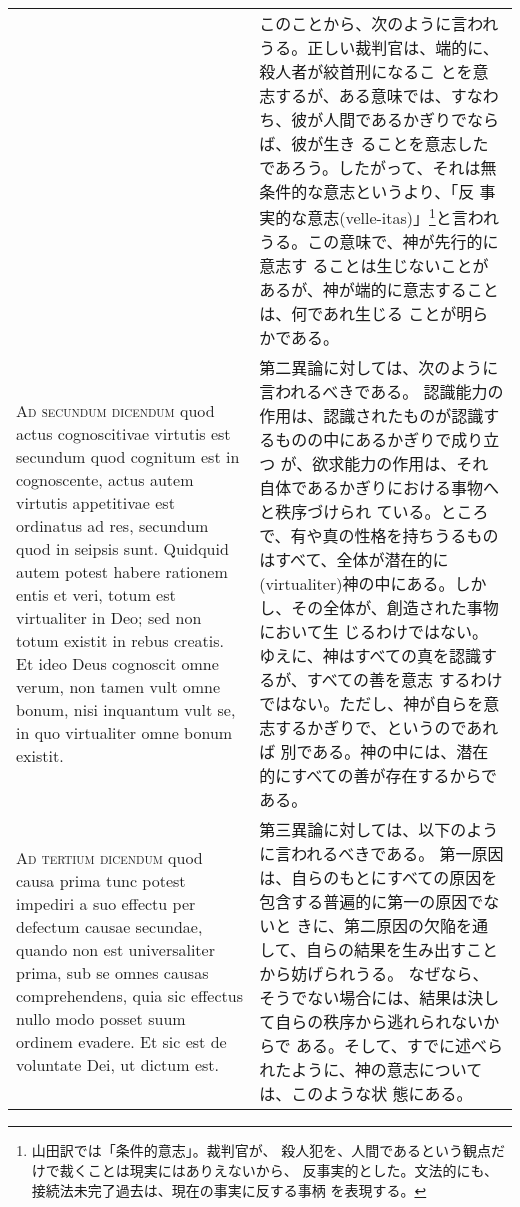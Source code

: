 \documentclass[10pt]{jsarticle} %
\begin{document}
\begin{longtable}{p{21em}p{21em}}
&

このことから、次のように言われうる。正しい裁判官は、端的に、殺人者が絞首刑になるこ
 とを意志するが、ある意味では、すなわち、彼が人間であるかぎりでならば、彼が生き
 ることを意志したであろう。したがって、それは無条件的な意志というより、「反
 事実的な意志(velle-itas)」\footnote{山田訳では「条件的意志」。裁判官が、
 殺人犯を、人間であるという観点だけで裁くことは現実にはありえないから、
 反事実的とした。文法的にも、接続法未完了過去は、現在の事実に反する事柄
 を表現する。}と言われうる。この意味で、神が先行的に意志す
 ることは生じないことがあるが、神が端的に意志することは、何であれ生じる
 ことが明らかである。


\\


{\scshape Ad secundum dicendum} quod actus cognoscitivae
virtutis est secundum quod cognitum est in cognoscente, actus autem
virtutis appetitivae est ordinatus ad res, secundum quod in seipsis
sunt. Quidquid autem potest habere rationem entis et veri, totum est
virtualiter in Deo; sed non totum existit in rebus creatis. Et ideo Deus
cognoscit omne verum, non tamen vult omne bonum, nisi inquantum vult se,
in quo virtualiter omne bonum existit.


&

第二異論に対しては、次のように言われるべきである。
認識能力の作用は、認識されたものが認識するものの中にあるかぎりで成り立つ
 が、欲求能力の作用は、それ自体であるかぎりにおける事物へと秩序づけられ
 ている。ところで、有や真の性格を持ちうるものはすべて、全体が潜在的に
 (virtualiter)神の中にある。しかし、その全体が、創造された事物において生
 じるわけではない。ゆえに、神はすべての真を認識するが、すべての善を意志
 するわけではない。ただし、神が自らを意志するかぎりで、というのであれば
 別である。神の中には、潜在的にすべての善が存在するからである。


\\


{\scshape Ad tertium dicendum} quod causa prima tunc
potest impediri a suo effectu per defectum causae secundae, quando non
est universaliter prima, sub se omnes causas comprehendens, quia sic
effectus nullo modo posset suum ordinem evadere. Et sic est de voluntate
Dei, ut dictum est.


&

第三異論に対しては、以下のように言われるべきである。
第一原因は、自らのもとにすべての原因を包含する普遍的に第一の原因でないと
 きに、第二原因の欠陥を通して、自らの結果を生み出すことから妨げられうる。
 なぜなら、そうでない場合には、結果は決して自らの秩序から逃れられないからで
 ある。そして、すでに述べられたように、神の意志については、このような状
 態にある。


\end{longtable}
\newpage
\end{document}
